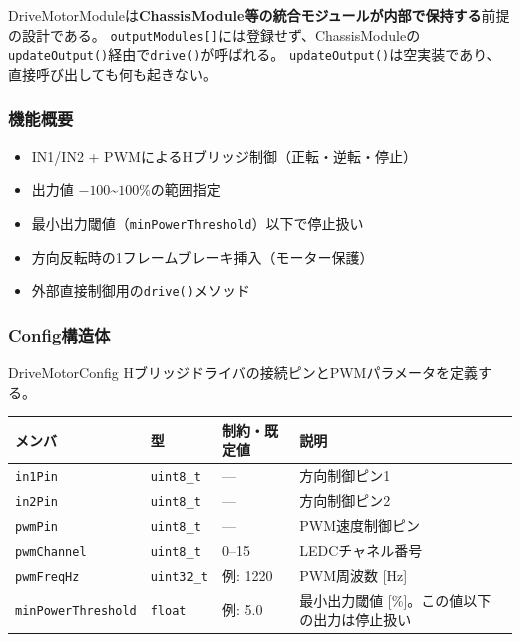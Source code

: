 \begin{cautionbox}
DriveMotorModuleは\textbf{ChassisModule等の統合モジュールが内部で保持する}前提の設計である。
\texttt{outputModules[]}には登録せず、ChassisModuleの\texttt{updateOutput()}経由で\texttt{drive()}が呼ばれる。
\texttt{updateOutput()}は空実装であり、直接呼び出しても何も起きない。
\end{cautionbox}

\subsubsection{機能概要}

\begin{itemize}
    \item IN1/IN2 + PWMによるHブリッジ制御（正転・逆転・停止）
    \item 出力値 $-100$\textasciitilde$100$\%の範囲指定
    \item 最小出力閾値（\texttt{minPowerThreshold}）以下で停止扱い
    \item 方向反転時の1フレームブレーキ挿入（モーター保護）
    \item 外部直接制御用の\texttt{drive()}メソッド
\end{itemize}

\subsubsection{Config構造体}

\begin{funcblock}{DriveMotorConfig}
Hブリッジドライバの接続ピンとPWMパラメータを定義する。

\begin{longtable}{l l l p{4.2cm}}
\toprule
\textbf{メンバ} & \textbf{型} & \textbf{制約・既定値} & \textbf{説明} \\
\midrule
\endhead
\texttt{in1Pin}            & \texttt{uint8\_t}  & ---       & 方向制御ピン1 \\
\texttt{in2Pin}            & \texttt{uint8\_t}  & ---       & 方向制御ピン2 \\
\texttt{pwmPin}            & \texttt{uint8\_t}  & ---       & PWM速度制御ピン \\
\texttt{pwmChannel}        & \texttt{uint8\_t}  & 0--15     & LEDCチャネル番号 \\
\texttt{pwmFreqHz}         & \texttt{uint32\_t} & 例: 1220  & PWM周波数 [Hz] \\
\texttt{minPowerThreshold} & \texttt{float}     & 例: 5.0   & 最小出力閾値 [\%]。この値以下の出力は停止扱い \\
\bottomrule
\end{longtable}
\end{funcblock}


